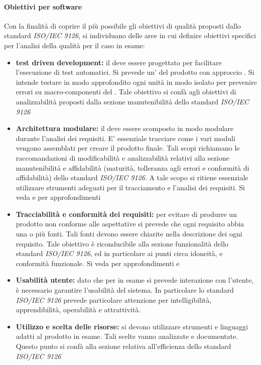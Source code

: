 \documentclass[12pt,a4paper]{article}
\begin{document}
	\paragraph{Obiettivi per software}
	Con la finalità di coprire il più possibile gli obiettivi di qualità proposti dallo standard \textit{ISO/IEC 9126}, si individuano delle aree in cui definire obiettivi specifici per l'analisi della qualità  per il caso in esame:
	
	\begin{itemize}
		\item \textbf{test driven development:} il  deve essere progettato per facilitare l'esecuzione di test automatici. Si prevede un'  del prodotto con approccio . Si intende testare in modo approfondito ogni unità  in modo isolato per prevenire errori su macro-componenti del . Tale obiettivo si confà agli obiettivi di analizzabilità proposti dalla sezione manutenibilità dello standard \textit{ISO/IEC 9126}
		\item \textbf{Architettura modulare:} il  deve essere scomposto in modo modulare durante l'analisi dei requisiti. E' essenziale tracciare come i vari moduli vengono assemblati per creare il prodotto finale. Tali scopi richiamano le raccomandazioni di modificabilità e analizzabilità relativi alla sezione manutenibilità e affidabilità (maturità, tolleranza agli errori e conformità di affidabilità) dello standard \textit{ISO/IEC 9126}. A tale scopo si ritiene essenziale utilizzare strumenti adeguati per il tracciamento e l'analisi dei requisiti. Si veda \NdP{} e \AdR{} per approfondimenti
		\item \textbf{Tracciabilità e conformità dei requisiti:} per evitare di produrre un prodotto non conforme alle aspettative si prevede che ogni requisito  abbia una o più fonti. Tali fonti devono essere chiarite nella descrizione dei ogni requisito. Tale obiettivo è riconducibile alla sezione funzionalità dello standard \textit{ISO/IEC 9126}, ed in particolare ai punti circa idoneità, e conformità funzionale. Si veda per approfondimenti \NdP{} e \AdR{}
		\item \textbf{Usabilità utente:} dato che per  in esame si prevede interazione con l'utente, è necessario garantire l'usabilità del sistema. In particolare lo standard \textit{ISO/IEC 9126} prevede particolare attenzione per intelligibilità, apprendibilità, operabilità e attrattività.
		\item \textbf{Utilizzo e scelta delle risorse:} si devono utilizzare strumenti e linguaggi adatti al prodotto in esame. Tali scelte vanno analizzate e documentate. Questo punto si confà alla sezione relativa all'efficienza dello standard \textit{ISO/IEC 9126}
	\end{itemize}
	
\end{document}
